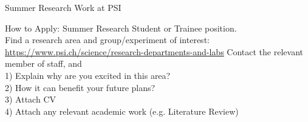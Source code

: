 \documentclass{beamer}
\begin{document}
\begin{frame}{Summer Research Work at PSI}
\begin{block}{How to Apply:}
Summer Research Student or Trainee position.\\
Find a research area and group/experiment of interest:\\
\url{https://www.psi.ch/science/research-departments-and-labs}
Contact the relevant member of staff, and \\
1) Explain why are you excited in this area? \\
2) How it can benefit your future plans? \\
3) Attach CV \\
4) Attach any relevant academic work (e.g. Literature Review)
\end{block}

\end{frame}
\end{document}
